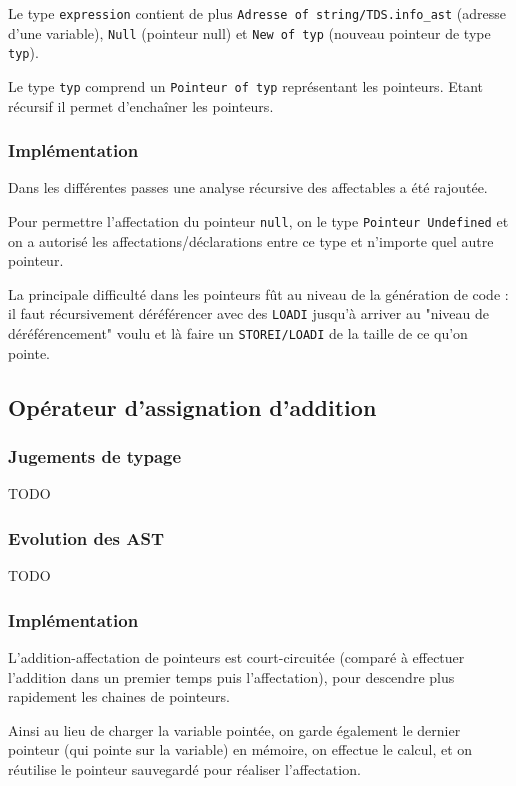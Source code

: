 \documentclass[headings=standardclasses,parskip=half]{scrartcl}
\begin{document}
Le type \texttt{expression} contient de plus
\texttt{Adresse of string/TDS.info\_ast} (adresse d'une variable),
\texttt{Null} (pointeur null) et \texttt{New of typ} (nouveau pointeur
de type \texttt{typ}).

Le type \texttt{typ} comprend un \texttt{Pointeur of typ} représentant
les pointeurs. Etant récursif il permet d'enchaîner les pointeurs.

\subsubsection*{Implémentation}

Dans les différentes passes une analyse récursive des affectables
a été rajoutée.

Pour permettre l'affectation du pointeur \texttt{null},
on le type \texttt{Pointeur Undefined}
et on a autorisé les affectations/déclarations entre ce type
et n'importe quel autre pointeur.

La principale difficulté dans les pointeurs fût au niveau de
la génération de code : il faut récursivement déréférencer avec des
\texttt{LOADI} jusqu'à arriver au "niveau de déréférencement" voulu
et là faire un \texttt{STOREI/LOADI} de la taille de ce qu'on pointe.

\subsection{Opérateur d'assignation d'addition}

\subsubsection*{Jugements de typage}

TODO

\subsubsection*{Evolution des AST}

TODO

\subsubsection*{Implémentation}

L'addition-affectation de pointeurs est court-circuitée
(comparé à effectuer l'addition dans un premier temps
puis l'affectation), pour descendre plus rapidement les chaines
de pointeurs.

Ainsi au lieu de charger la variable pointée,
on garde également le dernier pointeur (qui pointe sur la variable)
en mémoire, on effectue le calcul, et on réutilise
le pointeur sauvegardé pour réaliser l'affectation.
\end{document}
